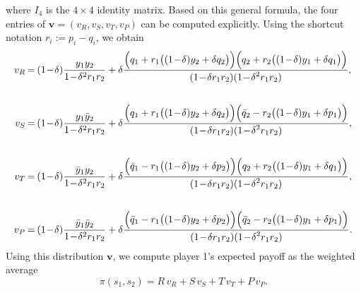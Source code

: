 \documentclass[11pt]{article}
\def\strategy{s}
\theoremstyle{plainCl1}
\theoremstyle{plainCl2}
\begin{document}
where $I_4$ is the $4\times4$ identity matrix. 
Based on this general formula, the four entries of $\mathbf{v}=(v_R, v_S, v_T, v_P)$ can be computed explicitly. 
Using the shortcut notation $r_i:=p_i\!-\!q_i$, we obtain
    \begin{equation} \label{Eq:vAverage}
      \setlength{\arraycolsep}{1pt}
      \begin{array}{rcl}    
      v_{R} &= &\displaystyle (1\!-\!\delta)\frac{y_1y_2}{1\!-\!\delta^2 r_1 r_2}+\delta \frac{\Big(q_1+r_1\big((1\!-\!\delta)y_2+\delta q_2\big)\Big) \Big(q_2+r_2\big((1\!-\!\delta)y_1+\delta q_1\big)\Big)}
      {\displaystyle(1\!-\!\delta r_1r_2)(1\!-\!\delta^2 r_1 r_2)},\\[1cm]
      v_{S}&= &\displaystyle (1\!-\!\delta)\frac{y_1\bar{y}_2}{1\!-\!\delta^2 r_1 r_2}+\delta \frac{\Big(q_1+r_1\big((1\!-\!\delta)y_2+\delta q_2\big)\Big) \Big(\bar{q}_2-r_2\big((1\!-\!\delta)y_1+\delta p_1\big)\Big)}
      {\displaystyle(1\!-\!\delta r_1r_2)(1\!-\!\delta^2 r_1 r_2)},\\[1cm]
      v_{T} &= &\displaystyle (1\!-\!\delta)\frac{\bar{y}_1y_2}{1\!-\!\delta^2 r_1 r_2}+\delta \frac{\Big(\bar{q}_1-r_1\big((1\!-\!\delta)y_2+\delta p_2\big)\Big) \Big(q_2+r_2\big((1\!-\!\delta)y_1+\delta q_1\big)\Big)}
      {\displaystyle(1\!-\!\delta r_1r_2)(1\!-\!\delta^2 r_1 r_2)},\\[1cm]
      v_{P} &= &\displaystyle (1\!-\!\delta)\frac{\bar{y}_1\bar{y}_2}{1\!-\!\delta^2 r_1 r_2}+\delta \frac{\Big(\bar{q}_1-r_1\big((1\!-\!\delta)y_2+\delta p_2\big)\Big) \Big(\bar{q}_2-r_2\big((1\!-\!\delta)y_1+\delta p_1\big)\Big)}
      {\displaystyle(1\!-\!\delta r_1r_2)(1\!-\!\delta^2 r_1 r_2)}.
      \end{array}
    \end{equation}
Using this distribution $\mathbf{v}$, we compute player 1's expected payoff as the weighted average
\begin{equation}\label{eq:expected_payoff}
\pi(\strategy_1,\strategy_2) = R \, v_R + S\,v_S + T\,v_T + P\,v_P. 
\end{equation}

\end{document}
